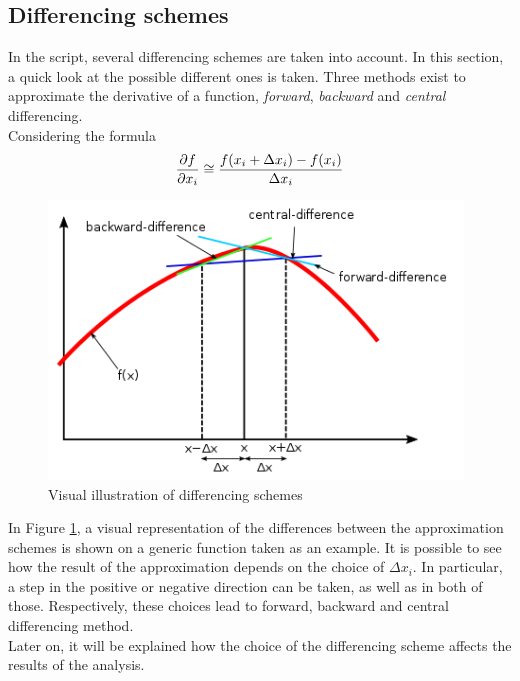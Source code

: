 \subsection{Differencing schemes}
In the script, several differencing schemes are taken into account. 
In this section, a quick look at the possible different ones is taken. Three methods exist to approximate the derivative of a function, \textit{forward}, \textit{backward} and \textit{central} differencing.\\[3pt]
Considering the formula 
\begin{equation}
\pdv{f}{x_i} \cong \frac{f(x_i + \Delta x_i) - f(x_i)}{\Delta x_i}
\end{equation}
\begin{figure}[ht]
  \centering
  \includegraphics[width=110mm]{images/differencing.png}
  \caption{Visual illustration of differencing schemes\\ \cite{wiki:finiteDifference}}
  \label{fig:differencingschemes}
\end{figure}
In Figure \ref{fig:differencingschemes}, a visual representation of the differences between the approximation schemes is shown on a generic function taken as an example.
It is possible to see how the result of the approximation depends on the choice of $\Delta x_i$.
In particular, a step in the positive or negative direction can be taken, as well as in both of those. Respectively, these choices lead to forward, backward and central differencing method. \cite{masching_dissertation} \\[3pt]
Later on, it will be explained how the choice of the differencing scheme affects the results of the analysis.





